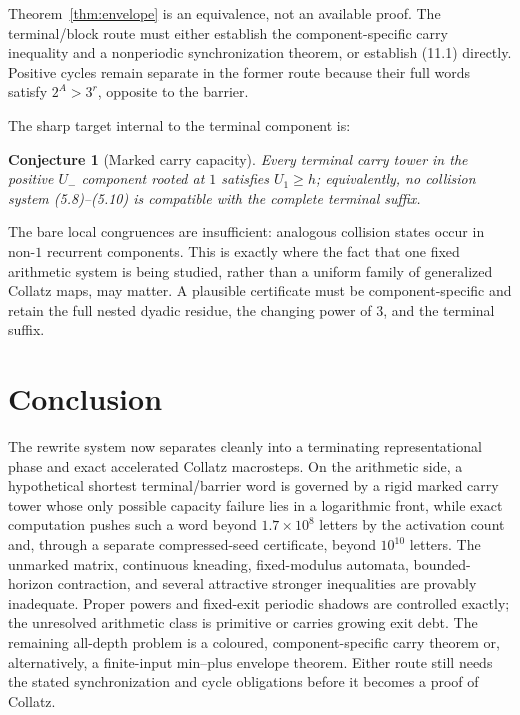 \documentclass[11pt,reqno]{amsart}
\newtheorem{conjecture}[theorem]{Conjecture}
\theoremstyle{remark}
\newcommand{\Um}{U_{-}}
\begin{document}
Theorem~\ref{thm:envelope} is an equivalence, not an available proof.  The
terminal/block route must either establish the component-specific carry
inequality and a nonperiodic synchronization theorem, or establish (11.1)
directly.  Positive cycles remain separate in the former route because their
full words satisfy $2^A>3^r$, opposite to the barrier.

The sharp target internal to the terminal component is:
\begin{conjecture}[Marked carry capacity]\label{conj:capacity}
Every terminal carry tower in the positive $\Um$ component rooted at $1$
satisfies $U_1\ge h$; equivalently, no collision system
(5.8)--(5.10) is compatible with the complete terminal suffix.
\end{conjecture}

The bare local congruences are insufficient: analogous collision states
occur in non-$1$ recurrent components.  This is exactly where the fact that
one fixed arithmetic system is being studied, rather than a uniform family
of generalized Collatz maps, may matter.  A plausible certificate must be
component-specific and retain the full nested dyadic residue, the changing
power of $3$, and the terminal suffix.

\section{Conclusion}

The rewrite system now separates cleanly into a terminating representational
phase and exact accelerated Collatz macrosteps.  On the arithmetic side, a
hypothetical shortest terminal/barrier word is governed by a rigid marked
carry tower whose only possible capacity failure lies in a logarithmic
front, while exact computation pushes such a word beyond $1.7\times10^8$
letters by the activation count and, through a separate compressed-seed
certificate, beyond $10^{10}$ letters.  The unmarked matrix, continuous
kneading, fixed-modulus automata, bounded-horizon contraction, and several
attractive stronger inequalities are provably inadequate.  Proper powers and
fixed-exit periodic shadows are controlled exactly; the unresolved arithmetic
class is primitive or carries growing exit debt.  The remaining all-depth
problem is a coloured, component-specific carry theorem or, alternatively, a
finite-input min--plus envelope theorem.  Either route still needs the stated
synchronization and cycle obligations before it becomes a proof of Collatz.
\end{document}
